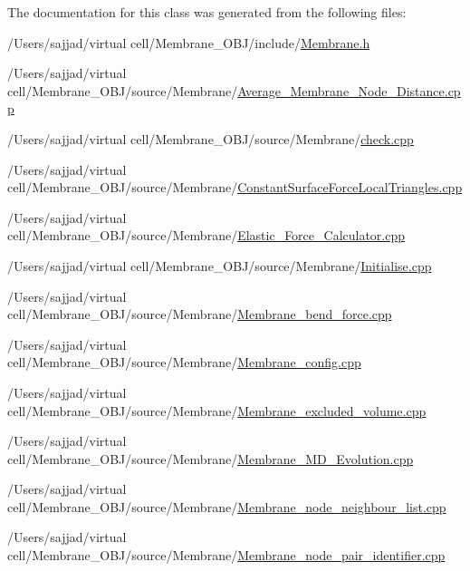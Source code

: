 The documentation for this class was generated from the following files\+:\begin{DoxyCompactItemize}
\item 
/\+Users/sajjad/virtual cell/\+Membrane\+\_\+\+O\+B\+J/include/\mbox{\hyperlink{Membrane_8h}{Membrane.\+h}}\item 
/\+Users/sajjad/virtual cell/\+Membrane\+\_\+\+O\+B\+J/source/\+Membrane/\mbox{\hyperlink{Average__Membrane__Node__Distance_8cpp}{Average\+\_\+\+Membrane\+\_\+\+Node\+\_\+\+Distance.\+cpp}}\item 
/\+Users/sajjad/virtual cell/\+Membrane\+\_\+\+O\+B\+J/source/\+Membrane/\mbox{\hyperlink{Membrane_2check_8cpp}{check.\+cpp}}\item 
/\+Users/sajjad/virtual cell/\+Membrane\+\_\+\+O\+B\+J/source/\+Membrane/\mbox{\hyperlink{ConstantSurfaceForceLocalTriangles_8cpp}{Constant\+Surface\+Force\+Local\+Triangles.\+cpp}}\item 
/\+Users/sajjad/virtual cell/\+Membrane\+\_\+\+O\+B\+J/source/\+Membrane/\mbox{\hyperlink{Membrane_2Elastic__Force__Calculator_8cpp}{Elastic\+\_\+\+Force\+\_\+\+Calculator.\+cpp}}\item 
/\+Users/sajjad/virtual cell/\+Membrane\+\_\+\+O\+B\+J/source/\+Membrane/\mbox{\hyperlink{Membrane_2Initialise_8cpp}{Initialise.\+cpp}}\item 
/\+Users/sajjad/virtual cell/\+Membrane\+\_\+\+O\+B\+J/source/\+Membrane/\mbox{\hyperlink{Membrane__bend__force_8cpp}{Membrane\+\_\+bend\+\_\+force.\+cpp}}\item 
/\+Users/sajjad/virtual cell/\+Membrane\+\_\+\+O\+B\+J/source/\+Membrane/\mbox{\hyperlink{Membrane__config_8cpp}{Membrane\+\_\+config.\+cpp}}\item 
/\+Users/sajjad/virtual cell/\+Membrane\+\_\+\+O\+B\+J/source/\+Membrane/\mbox{\hyperlink{Membrane__excluded__volume_8cpp}{Membrane\+\_\+excluded\+\_\+volume.\+cpp}}\item 
/\+Users/sajjad/virtual cell/\+Membrane\+\_\+\+O\+B\+J/source/\+Membrane/\mbox{\hyperlink{Membrane__MD__Evolution_8cpp}{Membrane\+\_\+\+M\+D\+\_\+\+Evolution.\+cpp}}\item 
/\+Users/sajjad/virtual cell/\+Membrane\+\_\+\+O\+B\+J/source/\+Membrane/\mbox{\hyperlink{Membrane__node__neighbour__list_8cpp}{Membrane\+\_\+node\+\_\+neighbour\+\_\+list.\+cpp}}\item 
/\+Users/sajjad/virtual cell/\+Membrane\+\_\+\+O\+B\+J/source/\+Membrane/\mbox{\hyperlink{Membrane__node__pair__identifier_8cpp}{Membrane\+\_\+node\+\_\+pair\+\_\+identifier.\+cpp}}\item 

\end{DoxyCompactItemize}
